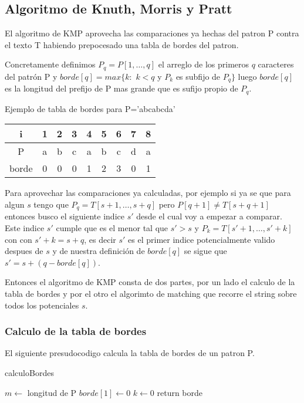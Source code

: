 \subsection{Algoritmo de Knuth, Morris y Pratt}
	El algoritmo de KMP aprovecha las comparaciones ya hechas del patron
	P contra el texto T habiendo prepocesado una tabla de bordes del 
	patron. 
	
	
	Concretamente definimos $P_q=P[1,\dots ,q]$ el arreglo
	de los primeros $q$ caracteres del patr\'on P y 
	$borde[q]=max\{k:$ $k<q$ y $P_k$ es subfijo de $P_q\}$ luego $borde[q]$ es la 
	longitud del prefijo de P mas grande que es sufijo propio de $P_q$.
	
	
	Ejemplo de tabla de bordes para P='abcabcda'
	
	
	\begin{table}[h]
		\centering
		\begin{tabular}[h]{|c|c |c |c |c |c |c |c |c |}
			\hline
			i & 1 & 2 & 3 & 4 & 5 & 6 & 7 & 8\\ \hline
			P & a &b&c&a&b&c&d&a \\ \hline
			borde & 0& 0& 0& 1& 2 &3& 0& 1 \\ \hline
		\end{tabular}
	\end{table}
	
	
	Para aprovechar las comparaciones ya calculadas, por ejemplo si ya
	se que para algun $s$ tengo que $P_q=T[s+1,\dots ,s+q]$ pero $P[q+1]\neq T[s+q+1]$ 
	entonces busco el siguiente indice $s'$ desde el cual voy a empezar a comparar. 
	Este indice $s'$ cumple que es el menor tal que $s'>s$ y $P_k=T[s'+1,\dots ,s'+k]$ con
	con $s'+k=s+q$, es decir $s'$ es el primer indice potencialmente valido despues de $s$ y
	de nuestra definici\'on de $borde[q]$ se sigue que $s'=s+(q-borde[q])$.
	
	Entonces el algoritmo de KMP consta de dos partes, por un lado el 
	calculo de la tabla de bordes y por el otro el algorimto de matching
	que recorre el string sobre todos los potenciales $s$.
	
	\subsubsection{Calculo de la tabla de bordes}
	El siguiente presudocodigo calcula la tabla de bordes de un patron P.
	
	\incmargin{1em}
	\linesnumbered
	\begin{algorithm}
	\caption{calculoBordes}
	\BlankLine

	$m\leftarrow$ longitud de P\;
	$borde[1] \leftarrow 0$\;
	$k\leftarrow 0$\;
	return borde\;
	\end{algorithm}
	\decmargin{1em}

